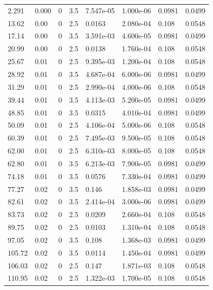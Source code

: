 \documentclass[preview]{standalone}
\begin{document}
{{\begin{tabular}{L{1.2cm}C{1.2cm} C{0.3cm}C{0.5cm} C{1.4cm}C{1.4cm} C{1.4cm}C{1.4cm}}
  2.291  &  0.000  & 0     & 3.5 &  7.547e-05  & 1.000e-06  & 0.0981 &  0.0499   \\ 
  13.62  &  0.00  & 0     & 2.5 &  0.0163  & 2.080e-04  & 0.108 &  0.0548   \\ 
  17.14  &  0.00  & 0     & 3.5 &  3.591e-03  & 4.600e-05  & 0.0981 &  0.0499   \\ 
  20.99  &  0.00  & 0     & 2.5 &  0.0138  & 1.760e-04  & 0.108 &  0.0548   \\ 
  25.67  &  0.01  & 0     & 2.5 &  9.395e-03  & 1.200e-04  & 0.108 &  0.0548   \\ 
  28.92  &  0.01  & 0     & 3.5 &  4.687e-04  & 6.000e-06  & 0.0981 &  0.0499   \\ 
  31.29  &  0.01  & 0     & 2.5 &  2.990e-04  & 4.000e-06  & 0.108 &  0.0548   \\ 
  39.44  &  0.01  & 0     & 3.5 &  4.113e-03  & 5.200e-05  & 0.0981 &  0.0499   \\ 
  48.85  &  0.01  & 0     & 3.5 &  0.0315  & 4.010e-04  & 0.0981 &  0.0499   \\ 
  50.09  &  0.01  & 0     & 2.5 &  4.106e-04  & 5.000e-06  & 0.108 &  0.0548   \\ 
  60.39  &  0.01  & 0     & 2.5 &  7.495e-03  & 9.500e-05  & 0.108 &  0.0548   \\ 
  62.00  &  0.01  & 0     & 2.5 &  6.310e-03  & 8.000e-05  & 0.108 &  0.0548   \\ 
  62.80  &  0.01  & 0     & 3.5 &  6.213e-03  & 7.900e-05  & 0.0981 &  0.0499   \\ 
  74.18  &  0.01  & 0     & 3.5 &  0.0576  & 7.330e-04  & 0.0981 &  0.0499   \\ 
  77.27  &  0.02  & 0     & 3.5 &  0.146  & 1.858e-03  & 0.0981 &  0.0499   \\ 
  82.61  &  0.02  & 0     & 3.5 &  2.414e-04  & 3.000e-06  & 0.0981 &  0.0499   \\ 
  83.73  &  0.02  & 0     & 2.5 &  0.0209  & 2.660e-04  & 0.108 &  0.0548   \\ 
  89.75  &  0.02  & 0     & 2.5 &  0.0103  & 1.310e-04  & 0.108 &  0.0548   \\ 
  97.05  &  0.02  & 0     & 3.5 &  0.108  & 1.368e-03  & 0.0981 &  0.0499   \\ 
  105.72  &  0.02  & 0     & 3.5 &  0.0114  & 1.450e-04  & 0.0981 &  0.0499   \\ 
  106.03  &  0.02  & 0     & 2.5 &  0.147  & 1.871e-03  & 0.108 &  0.0548   \\ 
  110.95  &  0.02  & 0     & 2.5 &  1.322e-03  & 1.700e-05  & 0.108 &  0.0548   \\ 

\end{tabular}}}
\end{document}
